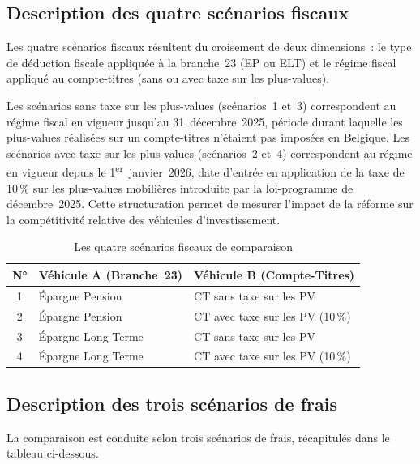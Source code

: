 ﻿\documentclass[12pt, a4paper]{article}
\begin{document}
\subsection{Description des quatre scénarios fiscaux}
\label{sub:scenarii_fiscaux}

Les quatre scénarios fiscaux résultent du croisement de deux dimensions~: le type
de déduction fiscale appliquée à la branche~23 (EP ou ELT) et le régime fiscal
appliqué au compte-titres (sans ou avec taxe sur les plus-values).

Les scénarios sans taxe sur les plus-values (scénarios~1 et~3) correspondent au
régime fiscal en vigueur jusqu'au 31~décembre~2025, période durant laquelle les
plus-values réalisées sur un compte-titres n'étaient pas imposées en Belgique.
Les scénarios avec taxe sur les plus-values (scénarios~2 et~4) correspondent au
régime en vigueur depuis le 1\textsuperscript{er}~janvier~2026, date d'entrée en
application de la taxe de 10\,\% sur les plus-values mobilières introduite par la
loi-programme de décembre~2025. Cette structuration permet de mesurer l'impact
de la réforme sur la compétitivité relative des véhicules d'investissement.

\begin{table}[h!]
  \centering
  \caption{Les quatre scénarios fiscaux de comparaison}
  \label{tab:scenarii}
  \begin{tabular}{|c|l|l|}
    \hline
    \textbf{N°} & \textbf{Véhicule A (Branche~23)} & \textbf{Véhicule B (Compte-Titres)} \\
    \hline
    1 & Épargne Pension & CT sans taxe sur les PV \\
    \hline
    2 & Épargne Pension & CT avec taxe sur les PV (10\,\%) \\
    \hline
    3 & Épargne Long Terme & CT sans taxe sur les PV \\
    \hline
    4 & Épargne Long Terme & CT avec taxe sur les PV (10\,\%) \\
    \hline
  \end{tabular}
\end{table}

\newpage

\subsection{Description des trois scénarios de frais}
\label{sub:scenarii_frais}

La comparaison est conduite selon trois scénarios de frais, 
récapitulés dans le tableau ci-dessous.
\end{document}
